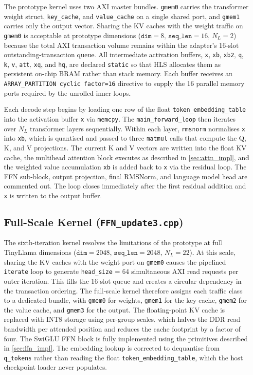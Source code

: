 The prototype kernel uses two AXI master bundles. \texttt{gmem0}
carries the transformer weight struct, \texttt{key\_cache}, and
\texttt{value\_cache} on a single shared port, and \texttt{gmem1}
carries only the output vector. Sharing the KV caches with the weight
traffic on \texttt{gmem0} is acceptable at prototype dimensions
($\texttt{dim} = 8$, $\texttt{seq\_len} = 16$, $N_L = 2$) because the
total AXI transaction volume remains within the adapter's 16-slot
outstanding-transaction queue. All intermediate activation buffers,
\texttt{x}, \texttt{xb}, \texttt{xb2}, \texttt{q}, \texttt{k},
\texttt{v}, \texttt{att}, \texttt{xq}, and \texttt{hq}, are declared
\texttt{static} so that HLS allocates them as persistent on-chip BRAM
rather than stack memory. Each buffer receives an
\texttt{ARRAY\_PARTITION cyclic factor=16} directive to supply the
16 parallel memory ports required by the unrolled inner loops.

Each decode step begins by loading one row of the float
\texttt{token\_embedding\_table} into the activation buffer \texttt{x}
via \texttt{memcpy}. The \texttt{main\_forward\_loop} then iterates
over $N_L$ transformer layers sequentially. Within each layer,
\texttt{rmsnorm} normalises \texttt{x} into \texttt{xb}, which is
quantised and passed to three \texttt{matmul} calls that compute the
Q, K, and V projections. The current K and V vectors are written into
the float KV cache, the multihead attention block executes as described
in \cref{sec:attn_impl}, and the weighted value accumulation
\texttt{xb} is added back to \texttt{x} via the residual loop. The
FFN sub-block, output projection, final RMSNorm, and language model
head are commented out. The loop closes immediately after the first
residual addition and \texttt{x} is written to the output buffer.

\subsection{Full-Scale Kernel (\texttt{FFN\_update3.cpp})}
\label{subsec:forward_update3_impl}

The sixth-iteration kernel resolves the limitations of the prototype at
full TinyLlama dimensions ($\texttt{dim} = 2048$,
$\texttt{seq\_len} = 2048$, $N_L = 22$). At this scale, sharing the
KV caches with the weight port on \texttt{gmem0} causes the pipelined
\texttt{iterate} loop to generate \texttt{head\_size} = 64 simultaneous
AXI read requests per outer iteration. This fills the 16-slot queue and
creates a circular dependency in the transaction ordering. The
full-scale kernel therefore assigns each traffic class to a dedicated
bundle, with \texttt{gmem0} for weights, \texttt{gmem1} for the key
cache, \texttt{gmem2} for the value cache, and \texttt{gmem3} for the
output. The floating-point KV cache is replaced with INT8 storage using
per-group scales, which halves the DDR read bandwidth per attended
position and reduces the cache footprint by a factor of four. The
SwiGLU FFN block is fully implemented using the primitives described in
\cref{sec:ffn_impl}. The embedding lookup is corrected to dequantise
from \texttt{q\_tokens} rather than reading the float
\texttt{token\_embedding\_table}, which the host checkpoint loader
never populates.

